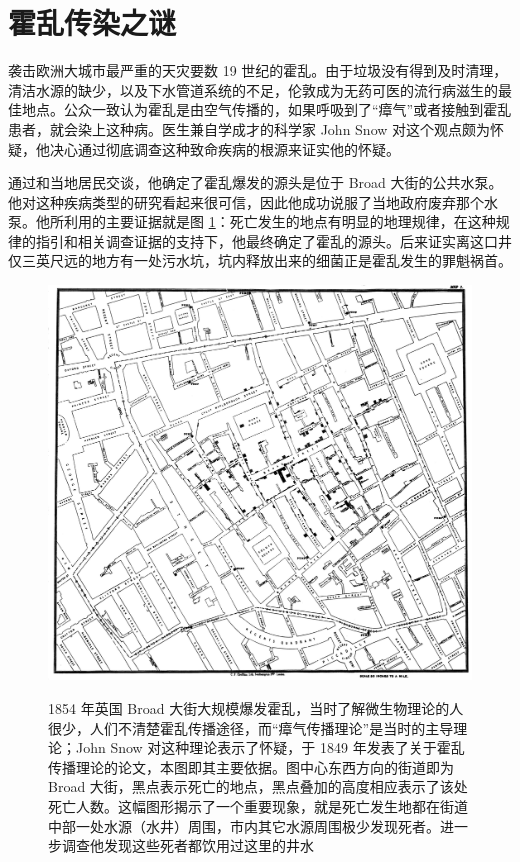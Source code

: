 \documentclass[
  b5paper,
  UTF8,twoside]{book}
\begin{document}
\section{霍乱传染之谜}\label{sec:the-mystery-of-cholera-infection}

袭击欧洲大城市最严重的天灾要数 19 世纪的霍乱。由于垃圾没有得到及时清理，清洁水源的缺少，以及下水管道系统的不足，伦敦成为无药可医的流行病滋生的最佳地点。公众一致认为霍乱是由空气传播的，如果呼吸到了``瘴气''或者接触到霍乱患者，就会染上这种病。医生兼自学成才的科学家 John Snow 对这个观点颇为怀疑，他决心通过彻底调查这种致命疾病的根源来证实他的怀疑。

通过和当地居民交谈，他确定了霍乱爆发的源头是位于 Broad 大街的公共水泵。他对这种疾病类型的研究看起来很可信，因此他成功说服了当地政府废弃那个水泵。他所利用的主要证据就是图 \ref{fig:snow-cholera}：死亡发生的地点有明显的地理规律，在这种规律的指引和相关调查证据的支持下，他最终确定了霍乱的源头。后来证实离这口井仅三英尺远的地方有一处污水坑，坑内释放出来的细菌正是霍乱发生的罪魁祸首。

\begin{figure}

{\centering \href{https://en.wikipedia.org/wiki/John_Snow_(physician)}{\includegraphics{images/Snow-cholera-map} }

}

\caption[John Snow 的霍乱传染原因探索图]{1854 年英国 Broad 大街大规模爆发霍乱，当时了解微生物理论的人很少，人们不清楚霍乱传播途径，而``瘴气传播理论''是当时的主导理论；John Snow 对这种理论表示了怀疑，于 1849 年发表了关于霍乱传播理论的论文，本图即其主要依据。图中心东西方向的街道即为 Broad 大街，黑点表示死亡的地点，黑点叠加的高度相应表示了该处死亡人数。这幅图形揭示了一个重要现象，就是死亡发生地都在街道中部一处水源（水井）周围，市内其它水源周围极少发现死者。进一步调查他发现这些死者都饮用过这里的井水}\label{fig:snow-cholera}
\end{figure}
\end{document}
